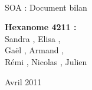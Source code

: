 \documentclass[a4paper]{article}
\begin{document}
\begin{titlepage}
~ 
\vfill
	\begin{center}
		\begin{Huge}
		SOA : Document bilan\\
		\end{Huge} 
\vfill
		\textbf{Hexanome 4211 :} 
		\\Sandra {}, Elisa , 
		\\Gaël , Armand , 
		\\Rémi , Nicolas , Julien \\

\vfill		
		\begin{Large}
		Avril 2011
		\end{Large}
\vfill
	\begin{tabular}{|c|c|c|c|c|}
 	 \hline
 	 \hline
 	 
 	\hline
 	
	\end{tabular}
\vfill	
	\end{center}
\vfill
\end{titlepage}

\newpage
\tableofcontents
\newpage


\end{document}
